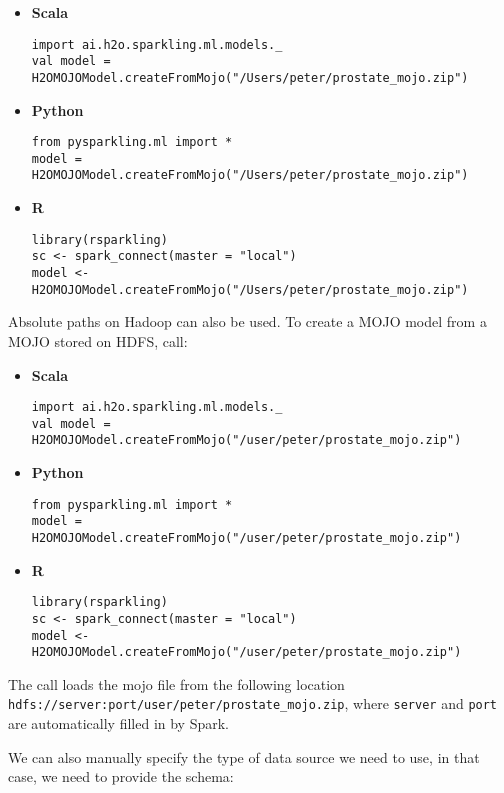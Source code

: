 \begin{itemize}
    \item \textbf{Scala} \begin{lstlisting}[style=Scala]
import ai.h2o.sparkling.ml.models._
val model = H2OMOJOModel.createFromMojo("/Users/peter/prostate_mojo.zip")
    \end{lstlisting}
    \item \textbf{Python} \begin{lstlisting}[style=Python]
from pysparkling.ml import *
model = H2OMOJOModel.createFromMojo("/Users/peter/prostate_mojo.zip")
    \end{lstlisting}
    \item \textbf{R} \begin{lstlisting}[style=R]
library(rsparkling)
sc <- spark_connect(master = "local")
model <- H2OMOJOModel.createFromMojo("/Users/peter/prostate_mojo.zip")
    \end{lstlisting}
\end{itemize}


Absolute paths on Hadoop can also be used. To create a MOJO model from a MOJO stored on HDFS, call:

\begin{itemize}
    \item \textbf{Scala} \begin{lstlisting}[style=Scala]
import ai.h2o.sparkling.ml.models._
val model = H2OMOJOModel.createFromMojo("/user/peter/prostate_mojo.zip")
    \end{lstlisting}
    \item \textbf{Python} \begin{lstlisting}[style=Python]
from pysparkling.ml import *
model = H2OMOJOModel.createFromMojo("/user/peter/prostate_mojo.zip")
    \end{lstlisting}
    \item \textbf{R} \begin{lstlisting}[style=R]
library(rsparkling)
sc <- spark_connect(master = "local")
model <- H2OMOJOModel.createFromMojo("/user/peter/prostate_mojo.zip")
    \end{lstlisting}
\end{itemize}


The call loads the mojo file from the following location\\ \texttt{hdfs://{server}:{port}/user/peter/prostate\_mojo.zip},
where \texttt{server} and \texttt{port} are automatically filled in by Spark.


We can also manually specify the type of data source we need to use, in that case, we need to provide the schema:

